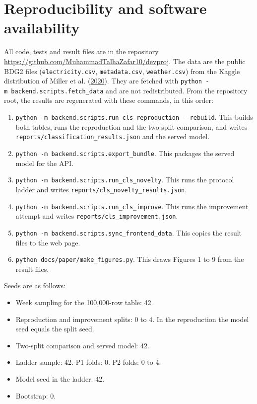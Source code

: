 \documentclass[
  10pt,
]{article}
\providecommand{\tightlist}{%
  \setlength{\itemsep}{0pt}\setlength{\parskip}{0pt}}
\begin{document}
\hypertarget{reproducibility-and-software-availability}{%
\section{Reproducibility and software
availability}\label{reproducibility-and-software-availability}}

All code, tests and result files are in the repository
\url{https://github.com/MuhammadTalhaZafar10/devproj}. The data are the
public BDG2 files (\texttt{electricity.csv}, \texttt{metadata.csv},
\texttt{weather.csv}) from the Kaggle distribution of Miller et al.
(\protect\hyperlink{ref-miller2020}{2020}). They are fetched with
\texttt{python\ -m\ backend.scripts.fetch\_data} and are not
redistributed. From the repository root, the results are regenerated
with these commands, in this order:

\begin{enumerate}
\def\labelenumi{\arabic{enumi}.}
\tightlist
\item
  \texttt{python\ -m\ backend.scripts.run\_cls\_reproduction\ -\/-rebuild}.
  This builds both tables, runs the reproduction and the two-split
  comparison, and writes \texttt{reports/classification\_results.json}
  and the served model.
\item
  \texttt{python\ -m\ backend.scripts.export\_bundle}. This packages the
  served model for the API.
\item
  \texttt{python\ -m\ backend.scripts.run\_cls\_novelty}. This runs the
  protocol ladder and writes
  \texttt{reports/cls\_novelty\_results.json}.
\item
  \texttt{python\ -m\ backend.scripts.run\_cls\_improve}. This runs the
  improvement attempt and writes \texttt{reports/cls\_improvement.json}.
\item
  \texttt{python\ -m\ backend.scripts.sync\_frontend\_data}. This copies
  the result files to the web page.
\item
  \texttt{python\ docs/paper/make\_figures.py}. This draws Figures 1 to
  9 from the result files.
\end{enumerate}

Seeds are as follows:

\begin{itemize}
\tightlist
\item
  Week sampling for the 100,000-row table: 42.
\item
  Reproduction and improvement splits: 0 to 4. In the reproduction the
  model seed equals the split seed.
\item
  Two-split comparison and served model: 42.
\item
  Ladder sample: 42. P1 folds: 0. P2 folds: 0 to 4.
\item
  Model seed in the ladder: 42.
\item
  Bootstrap: 0.
\end{itemize}
\end{document}

